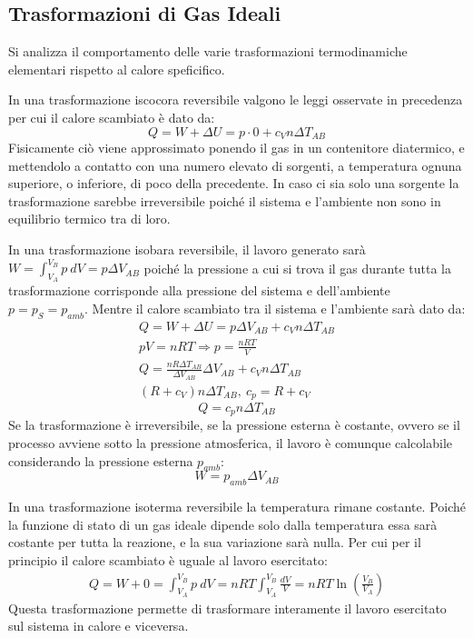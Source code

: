 \documentclass{article}
\numberwithin{equation}{subsection}
\begin{document}
\subsection{Trasformazioni di Gas Ideali}
Si analizza il comportamento delle varie trasformazioni termodinamiche elementari rispetto al calore speficifico.


In una trasformazione iscocora reversibile valgono le leggi osservate 
in precedenza per cui il calore scambiato è dato da: 
\begin{equation}
    Q=W+\Delta  U=p\cdot 0+c_Vn\Delta T_{AB}
\end{equation}
Fisicamente ciò viene approssimato ponendo il gas in un contenitore diatermico, e mettendolo a contatto con una numero elevato di sorgenti, a temperatura ognuna superiore, o 
inferiore, di poco della precedente. In caso ci sia solo una sorgente la trasformazione sarebbe irreversibile poiché il sistema e l'ambiente non sono in equilibrio termico 
tra di loro. 



In una trasformazione isobara reversibile, il lavoro generato sarà 
$W=\displaystyle\int_{V_A}^{V_B}p\:dV=p\Delta V_{AB}$ poiché la pressione a cui si trova il gas durante tutta la trasformazione corrisponde alla pressione 
del sistema e dell'ambiente $p=p_{S}=p_{amb}$. Mentre il 
calore scambiato tra il sistema e l'ambiente sarà 
dato da: 
\begin{gather*}
    Q=W+\Delta U=p\Delta V_{AB}+c_Vn\Delta T_{AB}\\
    pV=nRT\Rightarrow p=\displaystyle\frac{nRT}{V}\\
    Q=\displaystyle\frac{nR\Delta T_{AB}}{\Delta V_{AB}}\Delta V_{AB}+c_Vn\Delta T_{AB}\\
    (R+c_V)n\Delta T_{AB}{,}\:c_p=R+c_V
\end{gather*}
\begin{equation}
    Q=c_pn\Delta T_{AB}
\end{equation}
Se la trasformazione è irreversibile, se la pressione esterna è costante, ovvero se il processo avviene sotto la pressione atmosferica, il lavoro è comunque calcolabile 
considerando la pressione esterna $p_{amb}$: 
\begin{equation*}
    W=p_{amb}\Delta V_{AB}
\end{equation*}







In una trasformazione isoterma reversibile la temperatura rimane costante. Poiché la funzione di 
stato di un gas ideale dipende solo dalla temperatura essa 
sarà costante per tutta la reazione, e la sua variazione sarà 
nulla. Per cui per il principio il calore scambiato è uguale al lavoro esercitato:
\begin{gather}
    Q=W+0=\int_{V_A}^{V_B}p\:dV=nRT\int_{V_A}^{V_B}\displaystyle\frac{dV}{V}=nRT\ln\left(\displaystyle\frac{V_B}{V_A}\right)
\end{gather}
Questa trasformazione permette di trasformare interamente il 
lavoro esercitato sul sistema in calore e viceversa.
\end{document}
